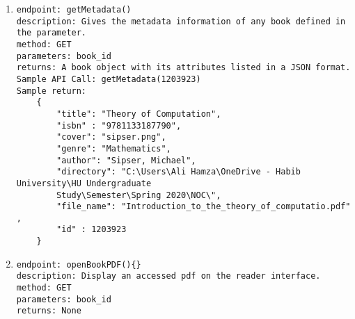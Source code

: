\documentclass[a4paper, 11pt]{article}
\begin{document}
\begin{enumerate}
\begin{verbatim}
    ...
]
              
\end{verbatim}
\item
\begin{verbatim}
endpoint: getMetadata()
description: Gives the metadata information of any book defined in the parameter.
method: GET
parameters: book_id
returns: A book object with its attributes listed in a JSON format.
Sample API Call: getMetadata(1203923)
Sample return:
    {
        "title": "Theory of Computation", 
        "isbn" : "9781133187790", 
        "cover": "sipser.png",
        "genre": "Mathematics", 
        "author": "Sipser, Michael", 
        "directory": "C:\Users\Ali Hamza\OneDrive - Habib University\HU Undergraduate 
        Study\Semester\Spring 2020\NOC\", 
        "file_name": "Introduction_to_the_theory_of_computatio.pdf" , 
        "id" : 1203923
    }
\end{verbatim}
\item 
\begin{verbatim}
endpoint: openBookPDF(){} 
description: Display an accessed pdf on the reader interface. 
method: GET
parameters: book_id
returns: None
\end{verbatim}

\end{enumerate}


\newpage
\end{document}

